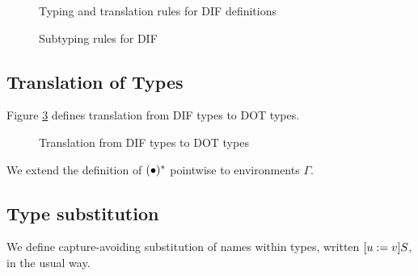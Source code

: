 \begin{figure}[h]
    
    \caption{Typing and translation rules for DIF definitions}
    \label{figure_typing_rules_definitions}
\end{figure}

\begin{figure}[h]
    
    \caption{Subtyping rules for DIF}
    \label{figure_subtyping_rules}
\end{figure}

\subsection{Translation of Types}

\begin{DEFINITION}
    \label{translation}
    Figure \ref{figure_translation} defines translation from DIF types to DOT
    types.
\end{DEFINITION}

\begin{figure}[h]
    
    \caption{Translation from DIF types to DOT types}
    \label{figure_translation}
\end{figure}

We extend the definition of $(\bullet)^{*}$ pointwise to environments
$\Gamma$.

\subsection{Type substitution}

\begin{DEFINITION}
    \label{substitution}
    We define capture-avoiding substitution of names within types, written
    $[u := v]S$, in the usual way.
\end{DEFINITION}
